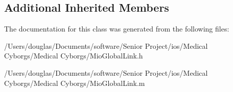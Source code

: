 \subsection*{Additional Inherited Members}


The documentation for this class was generated from the following files\-:\begin{DoxyCompactItemize}
\item 
/\-Users/douglas/\-Documents/software/\-Senior Project/ios/\-Medical Cyborgs/\-Medical Cyborgs/Mio\-Global\-Link.\-h\item 
/\-Users/douglas/\-Documents/software/\-Senior Project/ios/\-Medical Cyborgs/\-Medical Cyborgs/Mio\-Global\-Link.\-m\end{DoxyCompactItemize}
